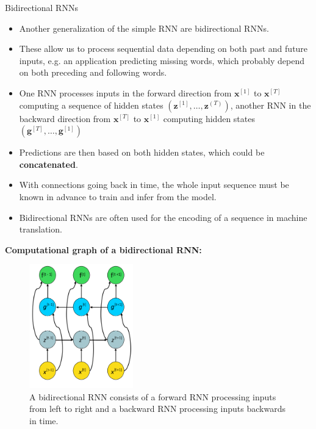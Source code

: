 \begin{vbframe}{Bidirectional RNNs}
  \begin{itemize}
    \item Another generalization of the simple RNN are bidirectional RNNs.
    \item These allow us to process sequential data depending on both past and future inputs, e.g. an application predicting missing words, which probably depend on both preceding and following words.
    \item One RNN processes inputs in the forward direction from $\mathbf{x}^{[1]}$ to $\mathbf{x}^{[T]}$ computing a sequence of hidden states $(\mathbf{z}^{[1]}, \dots, \mathbf{z}^{(T)})$, another RNN in the backward direction from $\mathbf{x}^{[T]}$ to $\mathbf{x}^{[1]}$ computing hidden states $(\mathbf{g}^{[T]}, \dots, \mathbf{g}^{[1]})$
    \item Predictions are then based on both hidden states, which could be \textbf{concatenated}.
    \item With connections going back in time, the whole input sequence must be known in advance
to train and infer from the model.
    \item Bidirectional RNNs are often used for the encoding of a sequence in machine translation.
  \end{itemize}
\framebreak  
\textbf{Computational graph of a bidirectional RNN:}
  \begin{figure}
    \includegraphics[width=4.5cm]{figure/bidirectional_rnn.png}
    \caption{A bidirectional RNN consists of a forward RNN processing inputs from left to right and a backward RNN processing inputs backwards in time.}
  \end{figure} 
\end{vbframe}


